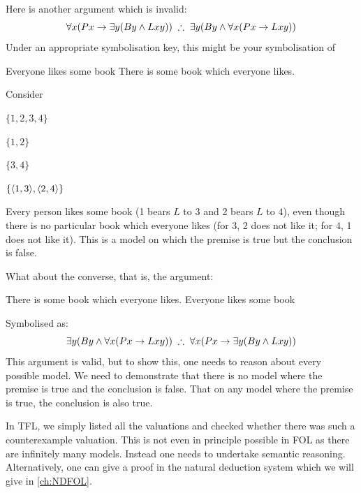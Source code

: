 Here is another argument which is invalid:
\[\forall x(Px\eif \exists y(By\eand Lxy))\;\therefore\; \exists y(By\eand \forall x(Px\eif Lxy))\]
Under an appropriate symbolisation key, this might be your symbolisation of 
\begin{earg}
	\prem Everyone likes some book
	\conc There is some book which everyone likes.
\end{earg}
Consider 
\begin{interp}
	\item[\domain] $\{1,2,3,4\}$
	\item[\denote{P}] $\{1,2\}$
	\item[\denote{B}] $\{3,4\}$
	\item[\denote{L}] $\{\langle1,3\rangle,\langle2,4\rangle\}$
\end{interp}
Every person likes some book (1 bears $L$ to $3$ and 2 bears $L$ to $4$), even though there is no particular book which everyone likes (for $3$, 2 does not like it; for $4$, 1 does not like it). 
This is a model on which the premise is true but the conclusion is false. 

What about the converse, that is, the argument: 
\begin{earg}
	\prem There is some book which everyone likes.
	\conc Everyone likes some book
\end{earg}
Symbolised as: 
\[\exists y(By\eand \forall x(Px\eif Lxy))\;\therefore\; \forall x(Px\eif \exists y(By\eand Lxy))\]
This argument is valid, but to show this, one needs to reason about every possible model. We need to demonstrate that there is no model where the premise is true and the conclusion is false. That on any model where the premise is true, the conclusion is also true. 

In TFL, we simply listed all the valuations and checked whether there was such a counterexample valuation. This is not even in principle possible in FOL as there are infinitely many models. Instead one needs to undertake semantic reasoning. Alternatively, one can give a proof in the natural deduction system which we will give in \cref{ch:NDFOL}. 
%
%	
%	
%	


